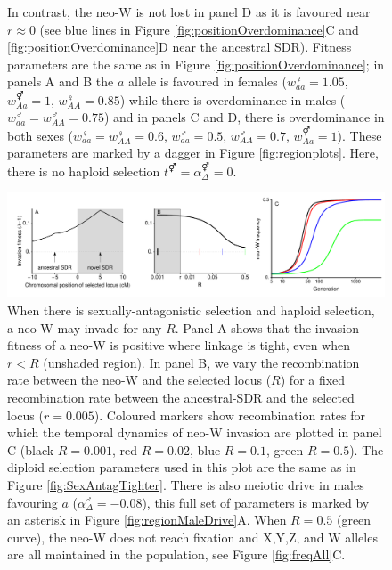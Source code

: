 \documentclass[12pt]{article}
\begin{document}
\begin{figure}[!h]
{In contrast, the neo-W is not lost in panel D as it is favoured near $r\approx0$ (see blue lines in Figure \ref{fig:positionOverdominance}C and  \ref{fig:positionOverdominance}D near the ancestral SDR). 
Fitness parameters are the same as in Figure \ref{fig:positionOverdominance}; in panels A and B the $a$ allele is favoured in females ($w_{aa}^\female=1.05$, $w_{Aa}^\Hermaphrodite=1$, $w_{AA}^\female=0.85$) while there is overdominance in males ($w_{aa}^\male=w_{AA}^\male=0.75$) and in panels C and D, there is overdominance in both sexes ($w_{aa}^\female=w_{AA}^\female=0.6$, $w_{aa}^\male=0.5$, $w_{AA}^\male=0.7$, $w_{Aa}^\Hermaphrodite=1$). 
These parameters are marked by a dagger in Figure \ref{fig:regionplots}. 
Here, there is no haploid selection $t^\Hermaphrodite = \alpha^\Hermaphrodite_\Delta = 0$.
}
\label{fig:temporalOverdominance}
\end{figure}

\begin{figure}[!h]
\centering
\centerline{\includegraphics[width=1.5\linewidth]{PositionPlot_SexAntagTighter_MaleDrive}}
\caption{
When there is sexually-antagonistic selection and haploid selection, a neo-W may invade for any $R$.
Panel A shows that the invasion fitness of a neo-W is positive where linkage is tight, even when $r<R$ (unshaded region).
In panel B, we vary the recombination rate between the neo-W and the selected locus ($R$) for a fixed recombination rate between the ancestral-SDR and the selected locus ($r=0.005$).
Coloured markers show recombination rates for which the temporal dynamics of neo-W invasion are plotted in panel C (black $R=0.001$, red $R=0.02$, blue $R=0.1$, green $R=0.5$). 
The diploid selection parameters used in this plot are the same as in Figure \ref{fig:SexAntagTighter}. 
There is also meiotic drive in males favouring $a$ ($\alpha_{\Delta}^\male=-0.08$), this full set of parameters is marked by an asterisk in Figure \ref{fig:regionMaleDrive}A.
When $R=0.5$ (green curve), the neo-W does not reach fixation and X,Y,Z, and W alleles are all maintained in the population, see Figure \ref{fig:freqAll}C.
}
\label{fig:SexAntagTighterMaleDrive}
\end{figure}
\end{document}
